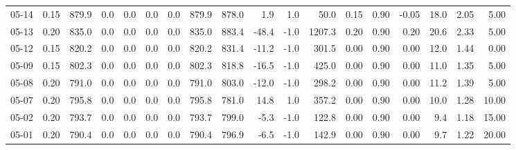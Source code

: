 \begin{threeparttable}
{\begin{tabular}{lrrrrrrrrrrrrrrrrr}
  05-14 &     0.15 & 879.9 &               0.0 &               0.0 &                0.0 &                0.0 & 879.9 & 878.0 &        1.9 &                      1.0 &                50.0 &       0.15 &      0.90 &          -0.05 &             18.0 &            2.05 &                   5.00 \\
  05-13 &     0.20 & 835.0 &               0.0 &               0.0 &                0.0 &                0.0 & 835.0 & 883.4 &      -48.4 &                     -1.0 &              1207.3 &       0.20 &      0.90 &           0.20 &             20.6 &            2.33 &                   5.00 \\
  05-12 &     0.15 & 820.2 &               0.0 &               0.0 &                0.0 &                0.0 & 820.2 & 831.4 &      -11.2 &                     -1.0 &               301.5 &       0.00 &      0.90 &           0.00 &             12.0 &            1.44 &                   0.00 \\
  05-09 &     0.15 & 802.3 &               0.0 &               0.0 &                0.0 &                0.0 & 802.3 & 818.8 &      -16.5 &                     -1.0 &               425.0 &       0.00 &      0.90 &           0.00 &             11.0 &            1.35 &                   5.00 \\
  05-08 &     0.20 & 791.0 &               0.0 &               0.0 &                0.0 &                0.0 & 791.0 & 803.0 &      -12.0 &                     -1.0 &               298.2 &       0.00 &      0.90 &           0.00 &             11.2 &            1.39 &                   5.00 \\
  05-07 &     0.20 & 795.8 &               0.0 &               0.0 &                0.0 &                0.0 & 795.8 & 781.0 &       14.8 &                      1.0 &               357.2 &       0.00 &      0.90 &           0.00 &             10.0 &            1.28 &                  10.00 \\
  05-02 &     0.20 & 793.7 &               0.0 &               0.0 &                0.0 &                0.0 & 793.7 & 799.0 &       -5.3 &                     -1.0 &               122.8 &       0.00 &      0.90 &           0.00 &              9.4 &            1.18 &                  15.00 \\
  05-01 &     0.20 & 790.4 &               0.0 &               0.0 &                0.0 &                0.0 & 790.4 & 796.9 &       -6.5 &                     -1.0 &               142.9 &       0.00 &      0.90 &           0.00 &              9.7 &            1.22 &                  20.00 \\

\end{tabular}}
\end{threeparttable}
